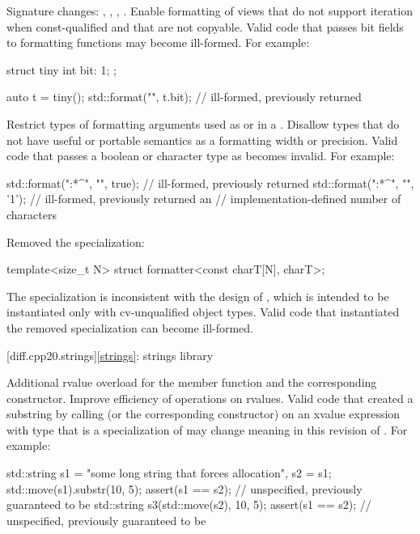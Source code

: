 \change
Signature changes: , , ,
.
\rationale
Enable formatting of views
that do not support iteration when const-qualified and
that are not copyable.
\effect
Valid \CppXX{} code that passes bit fields to formatting functions
may become ill-formed.
For example:
\begin{codeblock}
struct tiny {
  int bit: 1;
};

auto t = tiny();
std::format("{}", t.bit);       // ill-formed, previously returned 
\end{codeblock}

\change
Restrict types of formatting arguments
used as  or  in
a .
\rationale
Disallow types that do not have useful or portable semantics as
a formatting width or precision.
\effect
Valid \CppXX{} code that passes a boolean or character type as
 becomes invalid.
For example:
\begin{codeblock}
std::format("{:*^{}}", "", true);   // ill-formed, previously returned 
std::format("{:*^{}}", "", '1');    // ill-formed, previously returned an
                                    // implementation-defined number of  characters
\end{codeblock}

\change
Removed the  specialization:
\begin{codeblock}
template<size_t N> struct formatter<const charT[N], charT>;
\end{codeblock}
\rationale
The specialization is inconsistent with the design of ,
which is intended to be instantiated only with cv-unqualified object types.
\effect
Valid \CppXX{} code that instantiated the removed specialization
can become ill-formed.

[diff.cpp20.strings]{\ref{strings}: strings library}

\change
Additional rvalue overload for the  member function and
the corresponding constructor.
\rationale
Improve efficiency of operations on rvalues.
\effect
Valid \CppXX{} code that created a substring
by calling  (or the corresponding constructor)
on an xvalue expression with type 
that is a specialization of 
may change meaning in this revision of \Cpp{}.
For example:
\begin{codeblock}
std::string s1 = "some long string that forces allocation", s2 = s1;
std::move(s1).substr(10, 5);
assert(s1 == s2);       // unspecified, previously guaranteed to be 
std::string s3(std::move(s2), 10, 5);
assert(s1 == s2);       // unspecified, previously guaranteed to be 
\end{codeblock}

